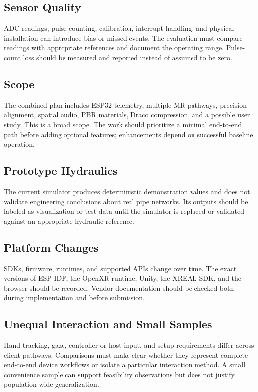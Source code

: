 \documentclass[conference]{IEEEtran}
\begin{document}
\subsection{Sensor Quality}
ADC readings, pulse counting, calibration, interrupt handling, and physical installation can introduce bias or missed events. The evaluation must compare readings with appropriate references and document the operating range. Pulse-count loss should be measured and reported instead of assumed to be zero.

\subsection{Scope}
The combined plan includes ESP32 telemetry, multiple MR pathways, precision alignment, spatial audio, PBR materials, Draco compression, and a possible user study. This is a broad scope. The work should prioritize a minimal end-to-end path before adding optional features; enhancements depend on successful baseline operation.

\subsection{Prototype Hydraulics}
The current simulator produces deterministic demonstration values and does not validate engineering conclusions about real pipe networks. Its outputs should be labeled as visualization or test data until the simulator is replaced or validated against an appropriate hydraulic reference.

\subsection{Platform Changes}
SDKs, firmware, runtimes, and supported APIs change over time. The exact versions of ESP-IDF, the OpenXR runtime, Unity, the XREAL SDK, and the browser should be recorded. Vendor documentation should be checked both during implementation and before submission.

\subsection{Unequal Interaction and Small Samples}
Hand tracking, gaze, controller or host input, and setup requirements differ across client pathways. Comparisons must make clear whether they represent complete end-to-end device workflows or isolate a particular interaction method. A small convenience sample can support feasibility observations but does not justify population-wide generalization.
\end{document}
